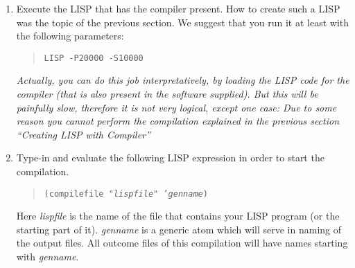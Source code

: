 \begin{enumerate}
\item
     Execute the LISP that has the compiler present. How to create such a
     LISP was the topic of the previous section. We suggest that you run
     it at least with the following parameters:
     \begin{quote}
        {\tt LISP -P20000 -S10000}
     \end{quote}

     {\em Actually, you can do this job interpretatively, by loading the
          LISP code for the compiler (that is also present in the software
          supplied). But this will be painfully slow, therefore it is not very
          logical, except one case: Due to some reason you cannot perform
          the compilation explained in the previous section
          ``Creating LISP with Compiler''}
\item
     Type-in and evaluate the following LISP expression in order to start
     the compilation.
     \begin{quote}
       {\tt  (compilefile "{\em{lispfile}}" '{\em genname})}
     \end{quote}
     Here {\em lispfile} is the name of the file that contains your LISP
     program (or the starting part of it). {\em genname} is a generic
     atom which will serve in naming of the  output files. All outcome
     files of this compilation will have names starting with {\em genname}.


\end{enumerate}
